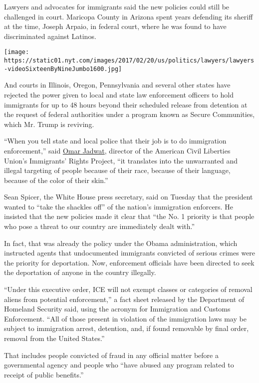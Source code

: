 Lawyers and advocates for immigrants said the new policies could still
be challenged in court. Maricopa County in Arizona spent years defending
its sheriff at the time, Joseph Arpaio, in federal court, where he was
found to have discriminated against Latinos.

\texttt{[image: https://static01.nyt.com/images/2017/02/20/us/politics/lawyers/lawyers-videoSixteenByNineJumbo1600.jpg]}

And courts in Illinois, Oregon, Pennsylvania and several other states
have rejected the power given to local and state law enforcement
officers to hold immigrants for up to 48 hours beyond their scheduled
release from detention at the request of federal authorities under a
program known as Secure Communities, which Mr. Trump is reviving.

``When you tell state and local police that their job is to do
immigration enforcement,'' said
\href{https://www.aclu.org/other/biography-omar-jadwat}{Omar Jadwat},
director of the American Civil Liberties Union's Immigrants' Rights
Project, ``it translates into the unwarranted and illegal targeting of
people because of their race, because of their language, because of the
color of their skin.''

Sean Spicer, the White House press secretary, said on Tuesday that the
president wanted to ``take the shackles off'' of the nation's
immigration enforcers. He insisted that the new policies made it clear
that ``the No. 1 priority is that people who pose a threat to our
country are immediately dealt with.''

In fact, that was already the policy under the Obama administration,
which instructed agents that undocumented immigrants convicted of
serious crimes were the priority for deportation. Now, enforcement
officials have been directed to seek the deportation of anyone in the
country illegally.

``Under this executive order, ICE will not exempt classes or categories
of removal aliens from potential enforcement,'' a fact sheet released by
the Department of Homeland Security said, using the acronym for
Immigration and Customs Enforcement. ``All of those present in violation
of the immigration laws may be subject to immigration arrest, detention,
and, if found removable by final order, removal from the United
States.''

That includes people convicted of fraud in any official matter before a
governmental agency and people who ``have abused any program related to
receipt of public benefits.''

